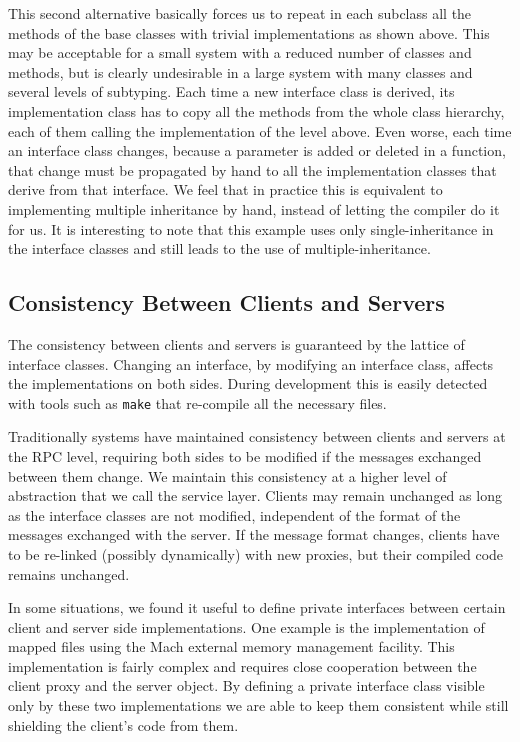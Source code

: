 This second alternative basically forces us to repeat in each subclass
all the methods of the base classes with trivial implementations as
shown above. This may be acceptable for a small system with a reduced
number of classes and methods, but is clearly undesirable in a large
system with many classes and several levels of subtyping. Each time a
new interface class is derived, its
implementation class has to copy all the methods from the whole class
hierarchy, each of them calling the implementation of the level above.
Even worse, each time an interface class changes, because a parameter
is added or deleted in a function, that change must be propagated by
hand to all the implementation classes that derive from that
interface. We feel that in practice this is equivalent to implementing
multiple inheritance by hand, instead of letting the compiler do it
for us.
It is interesting to note that this example uses only
single-inheritance in the interface classes and still leads to the
use of multiple-inheritance.

\subsection{Consistency Between Clients and Servers}

The consistency between clients and servers is guaranteed by the
lattice of interface classes. Changing an interface, by modifying
an interface class, affects the implementations on both sides. During
development this is easily detected with tools such as {\tt make}
that re-compile all the necessary files.

Traditionally systems have maintained consistency between clients and
servers at the RPC level, requiring both sides to be modified if the
messages exchanged between them change. We maintain this consistency
at a higher level of abstraction that we call the service
layer. Clients may remain unchanged as long as the interface classes
are not modified, independent of the format of the messages
exchanged with the server. If the message format changes, clients
have to be re-linked (possibly dynamically) with new proxies, but
their compiled code remains unchanged.

In some situations, we found it useful to define private interfaces
between certain client and server side implementations. One example is
the implementation of mapped files using the Mach external memory
management facility. This implementation is fairly complex and
requires close cooperation between the client proxy and the server
object. By defining a private interface class visible only by these
two implementations we are able to keep them consistent while still
shielding the client's code from them.

